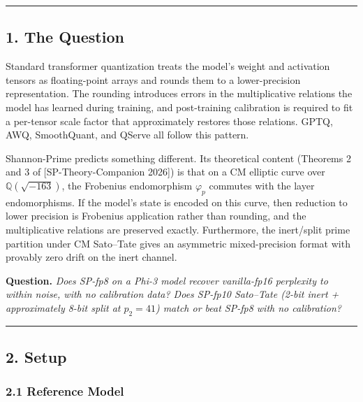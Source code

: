 \documentclass[
  11pt,
]{article}
\begin{document}
\begin{center}\rule{0.5\linewidth}{0.5pt}\end{center}

\hypertarget{the-question}{%
\subsection{1. The Question}\label{the-question}}

Standard transformer quantization treats the model's weight and
activation tensors as floating-point arrays and rounds them to a
lower-precision representation. The rounding introduces errors in the
multiplicative relations the model has learned during training, and
post-training calibration is required to fit a per-tensor scale factor
that approximately restores those relations. GPTQ, AWQ, SmoothQuant, and
QServe all follow this pattern.

Shannon-Prime predicts something different. Its theoretical content
(Theorems 2 and 3 of {[}SP-Theory-Companion 2026{]}) is that on a CM
elliptic curve over \(\mathbb{Q}(\sqrt{-163})\), the Frobenius
endomorphism \(\varphi_p\) commutes with the layer endomorphisms. If the
model's state is encoded on this curve, then reduction to lower
precision is Frobenius application rather than rounding, and the
multiplicative relations are preserved exactly. Furthermore, the
inert/split prime partition under CM Sato--Tate gives an asymmetric
mixed-precision format with provably zero drift on the inert channel.

\textbf{Question.} \emph{Does SP-fp8 on a Phi-3 model recover
vanilla-fp16 perplexity to within noise, with no calibration data? Does
SP-fp10 Sato--Tate (2-bit inert + approximately 8-bit split at
\(p_2 = 41\)) match or beat SP-fp8 with no calibration?}

\begin{center}\rule{0.5\linewidth}{0.5pt}\end{center}

\hypertarget{setup}{%
\subsection{2. Setup}\label{setup}}

\hypertarget{reference-model}{%
\subsubsection{2.1 Reference Model}\label{reference-model}}
\end{document}
